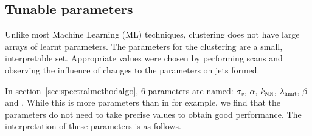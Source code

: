 \subsection{Tunable parameters}\label{sec:spectralmethodparam}
Unlike most Machine Learning (ML) techniques, \spectral{} clustering does not have large arrays of learnt parameters.
The parameters for the clustering are a small, interpretable  set.
Appropriate values were chosen by performing scans and observing the influence of changes to the parameters on jets formed.

In section~\ref{sec:spectralmethodalgo}, 6 parameters are named:
\(\sigma_v\), \(\alpha\), \(k_\text{NN}\), \(\lambda_\text{limit}\), \(\beta\) and \stoppingdeltar{}.
While this is more parameters than in \genkt{} for example,
we find that the parameters do not need to take precise values
to obtain good performance.
The interpretation of these parameters is as follows.
